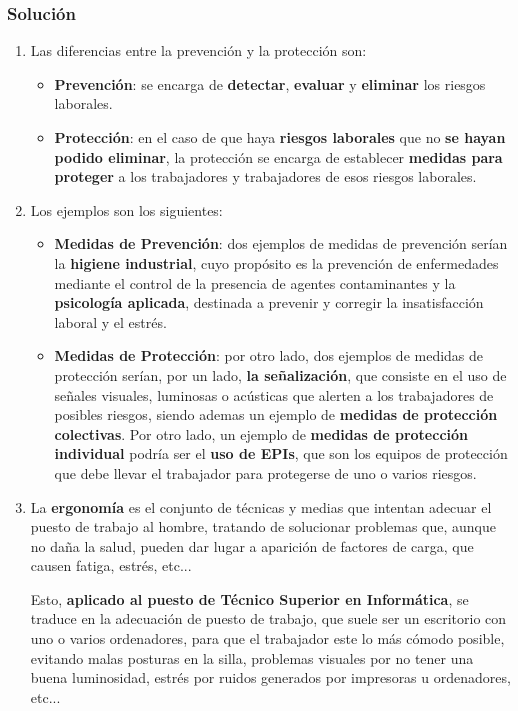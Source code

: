 \subsubsection{Solución}
\begin{enumerate}[label=\alph*.]
    \item Las diferencias entre la prevención y la protección son:
    \begin{itemize}
        \item \textbf{Prevención}: se encarga de  \textbf{detectar}, \textbf{evaluar} y \textbf{eliminar} los riesgos laborales.
        \item \textbf{Protección}: en el caso de que haya \textbf{riesgos laborales} que no\textbf{ se hayan podido eliminar}, la protección se encarga de establecer \textbf{medidas para proteger} a los trabajadores y trabajadores de esos riesgos laborales.
    \end{itemize}
    \item Los ejemplos son los siguientes:
    \begin{itemize}
        \item \textbf{Medidas de Prevención}: dos ejemplos de medidas de prevención serían la \textbf{higiene industrial}, cuyo propósito es la prevención de enfermedades mediante el control de la presencia de agentes contaminantes y la \textbf{psicología aplicada}, destinada a prevenir y corregir  la insatisfacción laboral y el estrés.

        \item \textbf{Medidas de Protección}: por otro lado, dos ejemplos de medidas de protección serían, por un lado, \textbf{la señalización}, que consiste en el uso de señales visuales, luminosas o acústicas que alerten a los trabajadores de posibles riesgos, siendo ademas un ejemplo de \textbf{medidas de protección colectivas}. Por otro lado, un ejemplo de \textbf{medidas de protección individual} podría ser el \textbf{uso de EPIs}, que son los equipos de protección que debe llevar el trabajador para protegerse de uno o varios riesgos.
    \end{itemize}
    \item La \textbf{ergonomía} es el conjunto de técnicas y medias que intentan adecuar el puesto de trabajo al hombre, tratando de solucionar problemas que, aunque no daña la salud, pueden dar lugar a aparición de factores de carga, que causen fatiga, estrés, etc...

    Esto, \textbf{aplicado al puesto de Técnico Superior en Informática}, se traduce en la adecuación de puesto de trabajo, que suele ser un escritorio con uno o varios ordenadores, para que el trabajador este lo más cómodo posible, evitando malas posturas en la silla, problemas visuales por no tener una buena luminosidad, estrés por ruidos generados por impresoras u ordenadores, etc...


\end{enumerate}
